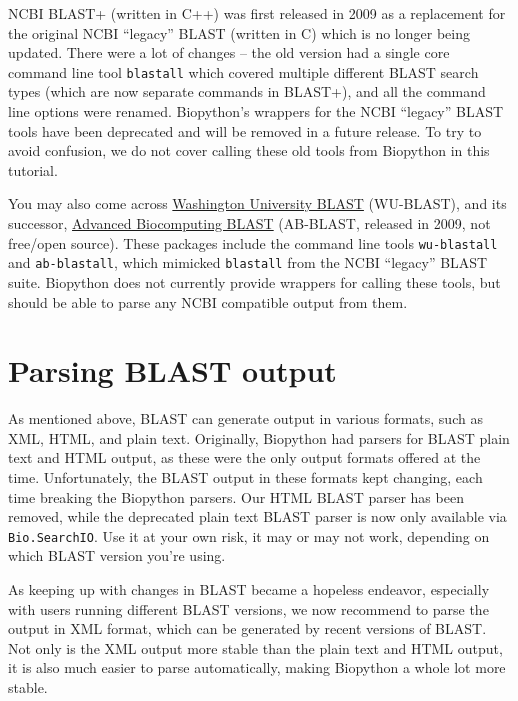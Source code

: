 NCBI BLAST+ (written in C++) was first released in 2009 as a replacement for
the original NCBI ``legacy'' BLAST (written in C) which is no longer being updated.
There were a lot of changes -- the old version had a single core command line
tool \verb|blastall| which covered multiple different BLAST search types (which
are now separate commands in BLAST+), and all the command line options
were renamed.
Biopython's wrappers for the NCBI ``legacy'' BLAST tools have been deprecated
and will be removed in a future release.
To try to avoid confusion, we do not cover calling these old tools from Biopython
in this tutorial.

You may also come across \href{http://blast.wustl.edu/}{Washington University BLAST}
(WU-BLAST), and its successor, \href{https://blast.advbiocomp.com}{Advanced Biocomputing
BLAST} (AB-BLAST, released in 2009, not free/open source). These packages include
the command line tools \verb|wu-blastall| and \verb|ab-blastall|, which mimicked
\verb|blastall| from the NCBI ``legacy'' BLAST suite.
Biopython does not currently provide wrappers for calling these tools, but should be able
to parse any NCBI compatible output from them.

\section{Parsing BLAST output}
\label{sec:parsing-blast}

As mentioned above, BLAST can generate output in various formats, such as
XML, HTML, and plain text. Originally, Biopython had parsers for BLAST
plain text and HTML output, as these were the only output formats offered
at the time. Unfortunately, the BLAST output in these formats kept changing,
each time breaking the Biopython parsers. Our HTML BLAST parser has been
removed, while the deprecated plain text BLAST parser is now only available
via \verb|Bio.SearchIO|. Use it at your own risk, it may or may not work,
depending on which BLAST version you're using.

As keeping up with changes in BLAST
became a hopeless endeavor, especially with users running different BLAST
versions, we now recommend to parse the output in XML format, which can be
generated by recent versions of BLAST. Not only is the XML output more stable
than the plain text and HTML output, it is also much easier to parse
automatically, making Biopython a whole lot more stable.

